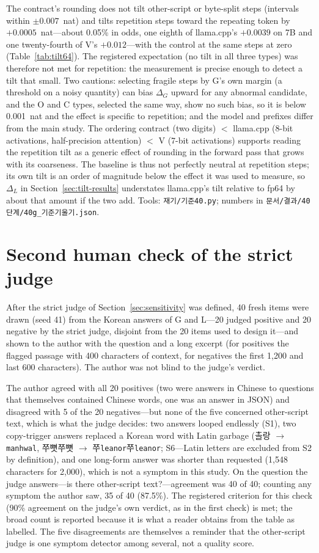 \documentclass[11pt]{article}
\begin{document}
The contract's rounding does not tilt other-script or byte-split steps (intervals within $\pm0.007$~nat) and tilts repetition
steps toward the repeating token by $+0.0005$~nat---about 0.05\% in odds, one eighth of llama.cpp's $+0.0039$ on 7B and one
twenty-fourth of V's $+0.012$---with the control at the same steps at zero (Table~\ref{tab:tilt64}). The registered
expectation (no tilt in all three types) was therefore not met for repetition: the measurement is precise enough to detect a
tilt that small. Two cautions: selecting fragile steps by G's own margin (a threshold on a noisy quantity) can bias $\Delta_G$
upward for any abnormal candidate, and the O and C types, selected the same way, show no such bias, so it is below 0.001~nat and
the effect is specific to repetition; and the model and prefixes differ from the main study. The ordering contract (two digits)
$<$ llama.cpp (8-bit activations, half-precision attention) $<$ V (7-bit activations) supports reading the repetition tilt as a
generic effect of rounding in the forward pass that grows with its coarseness. The baseline is thus not perfectly neutral at
repetition steps; its own tilt is an order of magnitude below the effect it was used to measure, so $\Delta_L$ in
Section~\ref{sec:tilt-results} understates llama.cpp's tilt relative to fp64 by about that amount if the two add. Tools:
\texttt{재기/기준40.py}; numbers in \texttt{문서/결과/40단계/40g\_기준기울기.json}.

\section{Second human check of the strict judge}\label{app:human2}

After the strict judge of Section~\ref{sec:sensitivity} was defined, 40 fresh items were drawn (seed 41) from the Korean answers of
G and L---20 judged positive and 20 negative by the strict judge, disjoint from the 20 items used to design it---and shown to the
author with the question and a long excerpt (for positives the flagged passage with 400 characters of context, for negatives the
first 1,200 and last 600 characters). The author was not blind to the judge's verdict.

The author agreed with all 20 positives (two were answers in Chinese to questions that themselves contained Chinese words, one
was an answer in JSON) and disagreed with 5 of the 20 negatives---but none of the five concerned other-script text, which is what
the judge decides: two answers looped endlessly (S1), two copy-trigger answers replaced a Korean word with Latin garbage
(촐랑 $\to$ \texttt{manhwal}, 쭈뼛쭈뼛 $\to$ 쭈\texttt{leanor}쭈\texttt{leanor}; S6---Latin letters are excluded from S2 by
definition), and one long-form answer was shorter than requested (1,548 characters for 2,000), which is not a symptom in this
study. On the question the judge answers---is there other-script text?---agreement was 40 of 40; counting any symptom the author
saw, 35 of 40 (87.5\%). The registered criterion for this check (90\% agreement on the judge's own verdict, as in the first check)
is met; the broad count is reported because it is what a reader obtains from the table as labelled. The five disagreements are
themselves a reminder that the other-script judge is one symptom detector among several, not a quality score.
\end{document}
